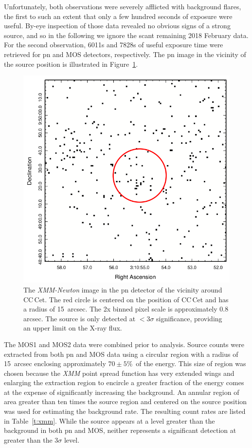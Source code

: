 \documentclass[fleqn,usenatbib]{mnras}
\begin{document}
Unfortunately, both observations were severely afflicted with background flares, the first to such an extent that only a few hundred seconds of exposure were useful.  By-eye inspection of those data revealed no obvious signs of a strong source, and so in the following we ignore the scant remaining 2018 February data. For the second observation, 6011s and 7828s of useful exposure time were retrieved for pn and MOS detectors, respectively. The pn image in the vicinity of the source position is illustrated in Figure~\ref{f:pn}.

\begin{figure}
    \centering
    \includegraphics[width=\columnwidth]{cc_cet_xmm_pn_1.pdf}
    \caption{The {\it XMM-Newton} image in the pn detector of the vicinity around CC\,Cet. The red circle is centered on the position of CC\,Cet and has a radius of 15~arcsec. The 2x binned pixel scale is approximately 0.8 arcsec. The source is only detected at $<3\sigma$ significance, providing an upper limit on the X-ray flux.}  
    \label{f:pn}
\end{figure}

The MOS1 and MOS2 data were combined prior to analysis. Source counts were extracted from both pn and MOS data using a circular region with a radius of 15~arcsec enclosing approximately $70\pm 5$\%\ of the energy.  This size of region was chosen because the \textit{XMM} point spread function has very extended wings and enlarging the extraction region to encircle a greater fraction of the energy comes at the expense of significantly increasing the background.  An annular region of area greater than ten times the source region and centered on the source position was used for estimating the background rate.  The resulting count rates are listed in Table~\ref{t:xmm}. While the source appears at a level greater than the background in both pn and MOS, neither represents a significant detection at greater than the $3\sigma$ level.   
\end{document}

